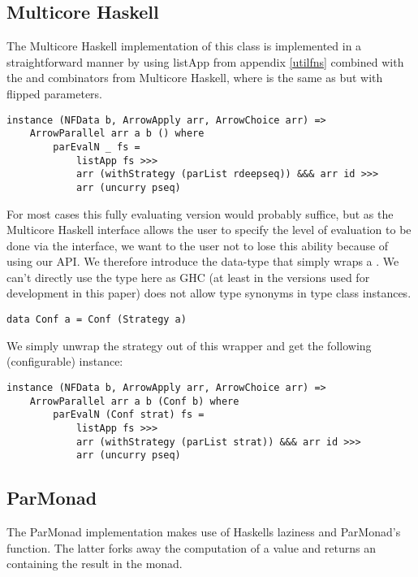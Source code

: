 \subsection{Multicore Haskell}
The Multicore Haskell implementation of this class is implemented in a straightforward manner by using listApp from appendix \ref{utilfns} combined with the  and  combinators from Multicore Haskell, where  is the same as  but with flipped parameters.
\begin{lstlisting}[frame=htrbl]
instance (NFData b, ArrowApply arr, ArrowChoice arr) =>
	ArrowParallel arr a b () where
    	parEvalN _ fs =
       		listApp fs >>>
        	arr (withStrategy (parList rdeepseq)) &&& arr id >>>
        	arr (uncurry pseq)
\end{lstlisting}%
For most cases this fully evaluating version would probably suffice, but as the Multicore Haskell interface allows the user to specify the level of evaluation to be done via the  interface, we want to the user not to lose this ability because of using our API. We therefore introduce the  data-type that simply wraps a . We can't directly use the  type here as GHC (at least in the versions used for development in this paper) does not allow type synonyms in type class instances.
\begin{lstlisting}[frame=htrbl]
data Conf a = Conf (Strategy a)
\end{lstlisting}
We simply unwrap the strategy out of this wrapper and get the following (configurable)  instance:
\begin{lstlisting}[frame=htrbl]
instance (NFData b, ArrowApply arr, ArrowChoice arr) =>
	ArrowParallel arr a b (Conf b) where
    	parEvalN (Conf strat) fs =
        	listApp fs >>>
        	arr (withStrategy (parList strat)) &&& arr id >>>
        	arr (uncurry pseq)
\end{lstlisting}
\subsection{ParMonad}
The ParMonad implementation makes use of Haskells laziness and ParMonad's  function. The latter forks away the computation of a value and returns an  containing the result in the  monad.



